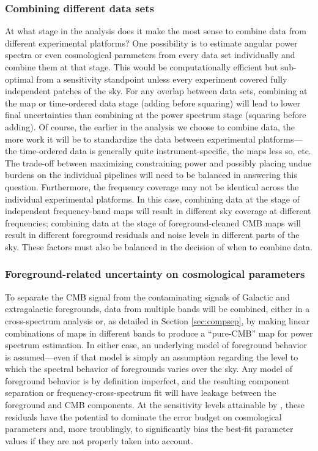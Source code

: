 \subsubsection{Combining different data sets}
\label{se:combine}
At what stage in the analysis does it make the most sense to combine data from different experimental platforms? 
One possibility is to estimate
angular power spectra or even cosmological parameters from every data set individually and combine them at that stage. This would
be computationally efficient but sub-optimal from a sensitivity standpoint unless every experiment
covered fully independent patches of the sky. For any overlap between data sets, combining at
the map or time-ordered data stage (adding before squaring) will lead to lower final uncertainties
than combining at the power spectrum stage (squaring before adding). Of course, the earlier in the analysis
we choose to combine data, the more work it will be to standardize the data between experimental platforms---the
time-ordered data is generally quite instrument-specific, the maps less so, etc. The trade-off between
maximizing constraining power and possibly placing undue burdens on the individual  
pipelines will need to be balanced in answering this question.
Furthermore, the frequency coverage may not be identical across the individual experimental platforms.
In this case, combining data at the stage of independent frequency-band maps will result in
different sky coverage at different frequencies; combining data at the stage of foreground-cleaned
CMB maps will result in different foreground residuals and noise levels in different parts of the sky.
These factors must also be balanced in the decision of when to combine data.

\subsubsection{Foreground-related uncertainty on cosmological parameters}
\label{se:paramforeg}


To separate the CMB signal from the contaminating signals of Galactic and extragalactic foregrounds, 
data from multiple bands will be combined, either 
in a cross-spectrum analysis or, as detailed in Section \ref{sec:compsep}, by making linear 
combinations of maps in different bands to produce a ``pure-CMB'' map for power spectrum estimation.
In either case, an underlying model of foreground behavior is assumed---even if that model is simply
an assumption regarding the level to which the spectral behavior of foregrounds varies over the sky.
Any model of foreground behavior is by definition imperfect, and the resulting component separation
or frequency-cross-spectrum fit will have leakage between the foreground and CMB components.
At the sensitivity levels attainable by \cmbexp, these residuals have the potential to dominate the
error budget on cosmological parameters and, more troublingly, to significantly bias the best-fit 
parameter values if they are not properly taken into account.


